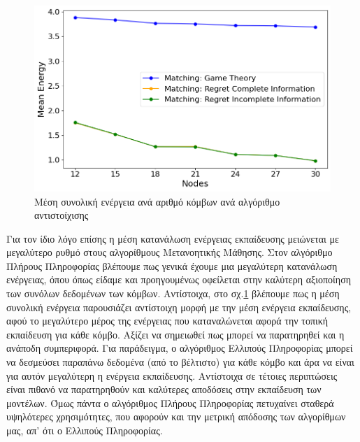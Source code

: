 \begin{figure}[H]
    \centering
    \includegraphics[width=\textwidth]{figures/chapter4/Mean_Energy_vs_Users.png}
    \caption{Μέση συνολική ενέργεια ανά αριθμό κόμβων ανά αλγόριθμο αντιστοίχισης}
    \label{fig36}
\end{figure}

\newpage

Για τον ίδιο λόγο επίσης η μέση κατανάλωση ενέργειας εκπαίδευσης μειώνεται με μεγαλύτερο ρυθμό στους αλγορίθμους Μετανοητικής Μάθησης. Στον αλγόριθμο Πλήρους Πληροφορίας βλέπουμε πως γενικά έχουμε μια μεγαλύτερη κατανάλωση ενέργειας, όπου όπως είδαμε και προηγουμένως οφείλεται στην καλύτερη αξιοποίηση των συνόλων δεδομένων των κόμβων. Αντίστοιχα, στο σχ.\ref{fig36} βλέπουμε πως η μέση συνολική ενέργεια παρουσιάζει αντίστοιχη μορφή με την μέση ενέργεια εκπαίδευσης, αφού το μεγαλύτερο μέρος της ενέργειας που καταναλώνεται αφορά την τοπική εκπαίδευση για κάθε κόμβο. Αξίζει να σημειωθεί πως μπορεί να παρατηρηθεί και η ανάποδη συμπεριφορά. Για παράδειγμα, ο αλγόριθμος Ελλιπούς Πληροφορίας μπορεί να δεσμεύσει παραπάνω δεδομένα (από το βέλτιστο) για κάθε κόμβο και άρα να είναι για αυτόν μεγαλύτερη η ενέργεια εκπαίδευσης. Αντίστοιχα σε τέτοιες περιπτώσεις είναι πιθανό να παρατηρηθούν και καλύτερες αποδόσεις στην εκπαίδευση των μοντέλων. Όμως πάντα ο αλγόριθμος Πλήρους Πληροφορίας πετυχαίνει σταθερά υψηλότερες χρησιμότητες, που αφορούν και την μετρική απόδοσης των αλγορίθμων μας, απ' ότι ο Ελλιπούς Πληροφορίας. 

